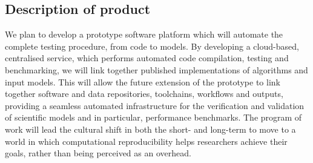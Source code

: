 \documentclass[a4paper,11pt]{article}
\begin{document}


\subsection*{Description of product}
We plan to develop a prototype software platform which will automate
the complete testing procedure, from code to models. By developing a
cloud-based, centralised service, which performs automated code
compilation, testing and benchmarking, we will link together published
implementations of algorithms and input models. This will allow the
future extension of the prototype to link together software and data
repositories, toolchains, workflows and outputs, providing a seamless
automated infrastructure for the verification and validation of
scientific models and in particular, performance benchmarks. The
program of work will lead the cultural shift in both the short- and
long-term to move to a world in which computational reproducibility
helps researchers achieve their goals, rather than being perceived as
an overhead.
\end{document}
